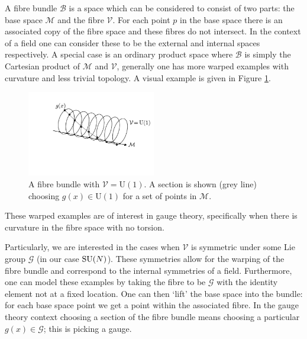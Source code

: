 A fibre bundle $\mathcal{B}$ is a space which can be considered to consist of two parts: the base space $\mathcal{M}$ and the fibre $\mathcal{V}$. For each point $p$ in the base space there is an associated copy of the fibre space and these fibres do not intersect. 
In the context of a field one can consider these to be the external and internal spaces respectively. A special case is an ordinary product space where $\mathcal{B}$ is simply the Cartesian product of $\mathcal{M}$ and $\mathcal{V}$, generally one has more warped examples with curvature and less trivial topology. A visual example is given in Figure \ref{fig:theory:fibre_bundle}.
\begin{figure}[h!]
    \centering
    \includegraphics[width=0.5\textwidth]{figures/theory/fibre_bundle.pdf}
    \caption{A fibre bundle with $\mathcal{V} = \mathrm{U}(1)$. A section is shown (grey line) choosing $g(x)\in\mathrm{U}(1)$ for a set of points in $\mathcal{M}$.}
    \label{fig:theory:fibre_bundle}
\end{figure}
These warped examples are of interest in gauge theory, specifically when there is curvature in the fibre space with no torsion.

Particularly, we are interested in the cases when $\mathcal{V}$ is symmetric under some Lie group $\mathcal{G}$ (in our case ${\mathrm{SU}(N)}$). 
These symmetries allow for the warping of the fibre bundle and correspond to the internal symmetries of a field. 
Furthermore, one can model these examples by taking the fibre to be $\mathcal{G}$ with the identity element not at a fixed location. 
One can then `lift' the base space into the bundle: for each base space point we get a point within the associated fibre. In the gauge theory context choosing a section of the fibre bundle means choosing a particular $g(x)\in\mathcal{G}$; this is picking a gauge. 

